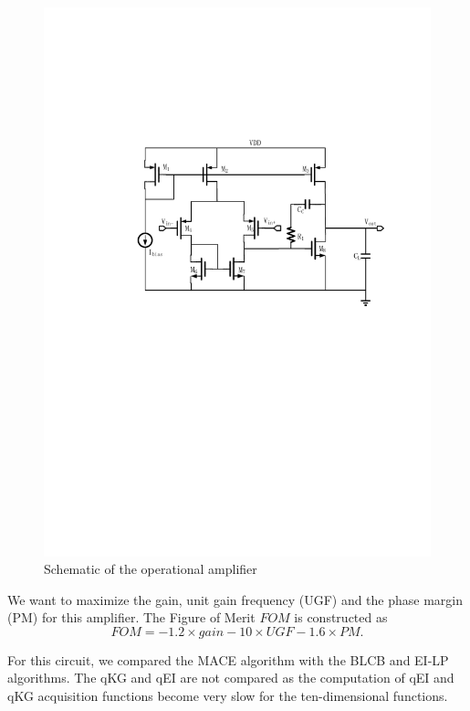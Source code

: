 \begin{figure}[!htb]
    \begin{center}
        \centerline{\includegraphics[width=\columnwidth]{./img/sopam.pdf}}
        \caption{Schematic of the operational amplifier}
        \label{fig:schDAC2014}
    \end{center}
    \vskip -0.2in
\end{figure}

We want to maximize the gain, unit gain frequency (UGF) and the phase margin (PM) for this amplifier. The Figure of Merit $FOM$ is constructed as
$$
\mathit{FOM} = -1.2 \times \mathit{gain} - 10 \times \mathit{UGF} - 1.6 \times \mathit{PM}.
$$

For this circuit, we compared the MACE algorithm with the BLCB and EI-LP
algorithms. The qKG and qEI are not compared as the computation of qEI and qKG
acquisition functions become very slow for the ten-dimensional functions.

